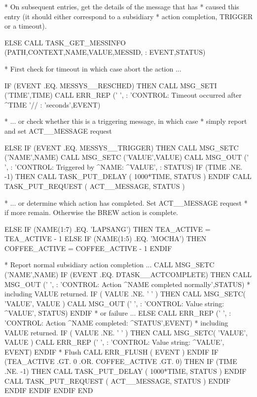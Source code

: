 \documentclass[twoside,11pt,nolof]{starlink}
\begin{document}
\begin{small}
\begin{terminalv}
*  On subsequent entries, get the details of the message that has
*  caused this entry (it should either correspond to a subsidiary
*  action completion, TRIGGER or a timeout).

         ELSE
            CALL TASK_GET_MESSINFO (PATH,CONTEXT,NAME,VALUE,MESSID,
     :        EVENT,STATUS)

*  First check for timeout in which case abort the action ...

            IF (EVENT .EQ. MESSYS__RESCHED) THEN
               CALL MSG_SETI ('TIME',TIME)
               CALL ERR_REP (' ',
     :           'CONTROL: Timeout occurred after ^TIME '//
     :           'seconds',EVENT)

*  ... or check whether this is a triggering message, in which case
*  simply report and set ACT__MESSAGE request

            ELSE IF (EVENT .EQ. MESSYS__TRIGGER) THEN
               CALL MSG_SETC ('NAME',NAME)
               CALL MSG_SETC ('VALUE',VALUE)
               CALL MSG_OUT (' ',
     :           'CONTROL: Triggered by ^NAME: ^VALUE',
     :           STATUS)
               IF (TIME .NE. -1) THEN
                 CALL TASK_PUT_DELAY ( 1000*TIME, STATUS )
               ENDIF
               CALL TASK_PUT_REQUEST ( ACT__MESSAGE, STATUS )

*  ... or determine which action has completed. Set ACT__MESSAGE request
*  if more remain. Otherwise the BREW action is complete.

            ELSE
               IF (NAME(1:7) .EQ. 'LAPSANG') THEN
                  TEA_ACTIVE = TEA_ACTIVE - 1
               ELSE IF (NAME(1:5) .EQ. 'MOCHA') THEN
                  COFFEE_ACTIVE = COFFEE_ACTIVE - 1
               ENDIF

*  Report normal subsidiary action completion ...
               CALL MSG_SETC ('NAME',NAME)
               IF (EVENT .EQ. DTASK__ACTCOMPLETE) THEN
                  CALL MSG_OUT (' ',
     :            'CONTROL: Action ^NAME completed normally',STATUS)
*  including VALUE returned.
                  IF ( VALUE .NE. ' ' ) THEN
                     CALL MSG_SETC( 'VALUE', VALUE )
                     CALL MSG_OUT (' ',
     :               'CONTROL: Value string: ^VALUE', STATUS)
                  ENDIF
*  or failure ...
               ELSE
                  CALL ERR_REP (' ',
     :            'CONTROL: Action ^NAME completed: ^STATUS',EVENT)
*  including VALUE returned.
                  IF ( VALUE .NE. ' ' ) THEN
                     CALL MSG_SETC( 'VALUE', VALUE )
                     CALL ERR_REP (' ',
     :               'CONTROL: Value string: ^VALUE', EVENT)
                  ENDIF
*  Flush
                  CALL ERR_FLUSH ( EVENT )
               ENDIF
               IF (TEA_ACTIVE .GT. 0 .OR. COFFEE_ACTIVE .GT. 0) THEN
                  IF (TIME .NE. -1) THEN
                     CALL TASK_PUT_DELAY ( 1000*TIME, STATUS )
                  ENDIF
                  CALL TASK_PUT_REQUEST ( ACT__MESSAGE, STATUS )
               ENDIF
            ENDIF
         ENDIF
      ENDIF
      END

\end{terminalv}
\end{small}
\end{document}
